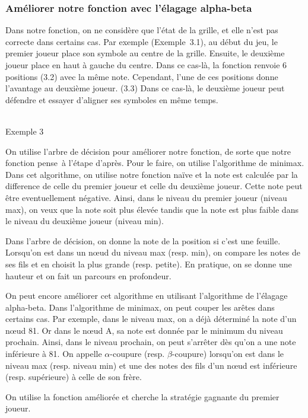 \documentclass[12pt, a4paper]{article}
\begin{document}
\subsubsection{Améliorer notre fonction avec l'élagage alpha-beta}
Dans notre fonction, on ne considère que l'état de la grille, et elle n'est pas correcte dans certains cas. Par exemple \mbox{(Exemple 3.1)}, au début du jeu, le premier joueur place son symbole au centre de la grille. Ensuite, le deuxième joueur place en haut à gauche du centre. Dans ce cas-là, la fonction renvoie 6 positions (3.2) avec la même note. Cependant, l'une de ces positions donne l'avantage au deuxième joueur. (3.3) Dans ce cas-là, le deuxième joueur peut défendre et essayer d'aligner ses symboles en même temps. 
\begin{center}
    \cleargoban
    \cleargoban
    \cleargoban
    \\
    Exemple 3
\end{center}
\par
On utilise l'arbre de décision pour améliorer notre fonction, de sorte que notre fonction \og pense\fg \ à l'étape d'après. Pour le faire, on utilise l'algorithme de minimax. Dans cet algorithme, on utilise notre fonction naïve et la note est calculée par la difference de celle du premier joueur et celle du deuxième joueur. Cette note peut être eventuellement négative. Ainsi, dans le niveau du premier joueur (niveau max), on veux que la note soit plus élevée tandis que la note est plus faible dans le niveau du deuxième joueur (niveau min).\par
Dans l'arbre de décision, on donne la note de la position si c'est une feuille. Lorsqu'on est dans un nœud du niveau max (resp. min), on compare les notes de ses fils et en choisit la plus grande (resp. petite). En pratique, on se donne une hauteur et on fait un parcours en profondeur.\par
On peut encore améliorer cet algorithme en utilisant l'algorithme de l'élagage alpha-beta. Dans l'algorithme de minimax, on peut couper les arêtes dans certains cas. Par exemple, dans le niveau max, on a déjà déterminé la note d'un nœud 81. Or dans le nœud A, sa note est donnée par le minimum du niveau prochain. Ainsi, dans le niveau prochain, on peut s'arrêter dès qu'on a une note inférieure à 81.
On appelle $\alpha$-coupure (resp. $\beta$-coupure) lorsqu'on est dans le niveau max (resp. niveau min) et une des notes des fils d'un nœud est inférieure (resp. supérieure) à celle de son frère.\par
On utilise la fonction améliorée et cherche la stratégie gagnante du premier joueur.
\end{document}
